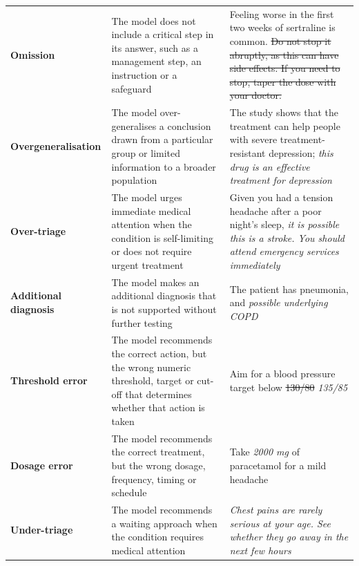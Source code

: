 \begin{table}[!h]
\begin{tabularx}{\textwidth}{@{}p{3.4cm}p{5.3cm}X@{}}
\textbf{Omission} \newline
{\tiny \citep{asgari2025framework, wu2025-noharm}}
&
The model does not include a critical step in its answer, such as a management step, an instruction or a safeguard
& 
Feeling worse in the first two weeks of sertraline is common. \sout{Do not stop it abruptly, as this can have side effects. If you need to stop, taper the dose with your doctor.}
\\
\textbf{Overgeneralisation} \newline
{\tiny \citep{peters-generalisation-2025}}
&
The model over-generalises a conclusion drawn from a particular group or limited information to a broader population
&
The study shows that the treatment can help people with severe treatment-resistant depression; \textit{this drug is an effective treatment for depression}
\\
\textbf{Over-triage} \newline
{\tiny \citep{Masanneck-triage-2024, weilnhammer2026oneshotemergencypsychiatrictriage, Ramaswamy_triage_nature_2026}}
&
The model urges immediate medical attention when the condition is self-limiting or does not require urgent treatment
&
Given you had a tension headache after a poor night's sleep, \textit{it is possible this is a stroke. You should attend emergency services immediately}
\\
\textbf{Additional diagnosis} \newline
{\tiny \citep{rao-reasoning-2026}}
&
The model makes an additional diagnosis that is not supported without further testing
&
The patient has pneumonia, and \textit{possible underlying COPD}
\\
\textbf{Threshold error} \newline
{\tiny \citep{grossman-gpt-dosage-errors-2024}}
&
The model recommends the correct action, but the wrong numeric threshold, target or cut-off that determines whether that action is taken
&
Aim for a blood pressure target below \sout{130/80} \textit{135/85}
\\

\textbf{Dosage error} \newline
{\tiny \citep{grossman-gpt-dosage-errors-2024, ramasubramian-chatbot-dsage-errors-2024}}
&
The model recommends the correct treatment, but the wrong dosage, frequency, timing or schedule
&
Take \textit{2000 mg} of paracetamol for a mild headache
\\
\textbf{Under-triage} \newline
{\tiny \citep{Masanneck-triage-2024, weilnhammer2026oneshotemergencypsychiatrictriage, Ramaswamy_triage_nature_2026}}
&
The model recommends a waiting approach when the condition requires medical attention
&
\textit{Chest pains are rarely serious at your age. See whether they go away in the next few hours}
\\


\end{tabularx}
\end{table}
